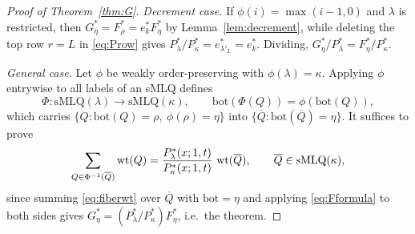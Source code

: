 \begin{proof}[Proof of Theorem~\ref{thm:G}]
\emph{Decrement case.} If $\phi(i)=\max(i-1,0)$ and $\lambda$ is restricted, then
$G^*_\eta=F^*_\rho=e^*_k F^*_\eta$ by Lemma~\ref{lem:decrement}, while deleting the
top row $r=L$ in \eqref{eq:Prow} gives $P^*_\lambda/P^*_\kappa=e^*_{\lambda'_L}=e^*_k$.
Dividing, $G^*_\eta/P^*_\lambda=F^*_\eta/P^*_\kappa$.

\emph{General case.} Let $\phi$ be weakly order-preserving with $\phi(\lambda)=\kappa$.
Applying $\phi$ entrywise to all labels of an sMLQ defines
\[
\Phi:\mathrm{sMLQ}(\lambda)\to\mathrm{sMLQ}(\kappa),\qquad
\mathrm{bot}(\Phi(Q))=\phi(\mathrm{bot}(Q)),
\]
which carries $\{Q:\mathrm{bot}(Q)=\rho,\ \phi(\rho)=\eta\}$ into
$\{\overline Q:\mathrm{bot}(\overline Q)=\eta\}$. It suffices to prove
\begin{equation}\label{eq:fiberwt}
\sum_{Q\in\Phi^{-1}(\overline Q)}\operatorname{wt}(Q)
=\frac{P^*_\lambda(x;1,t)}{P^*_\kappa(x;1,t)}\,\operatorname{wt}(\overline Q),
\qquad \overline Q\in\mathrm{sMLQ}(\kappa),
\end{equation}
since summing \eqref{eq:fiberwt} over $\overline Q$ with $\mathrm{bot}=\eta$ and
applying \eqref{eq:Fformula} to both sides gives
$G^*_\eta=(P^*_\lambda/P^*_\kappa)F^*_\eta$, i.e.\ the theorem.


\end{proof}
